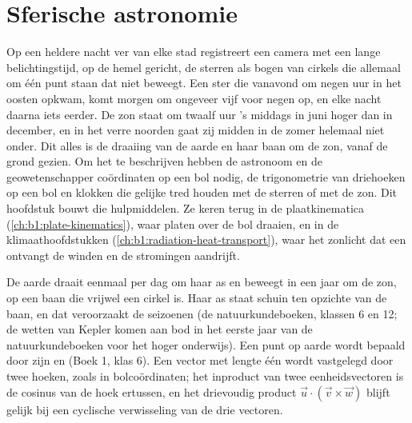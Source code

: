 \chapter{Sferische astronomie}\label{ch:b1:spherical-astronomy}

Op een heldere nacht ver van elke stad registreert een camera met een lange
belichtingstijd, op de hemel gericht, de sterren als bogen van cirkels die
allemaal om één punt staan dat niet beweegt. Een ster die vanavond om negen
uur in het oosten opkwam, komt morgen om ongeveer vijf voor negen op, en elke
nacht daarna iets eerder. De zon staat om twaalf uur 's middags in juni hoger
dan in december, en in het verre noorden gaat zij midden in de zomer helemaal
niet onder. Dit alles is de draaiing van de aarde en haar baan om de zon, vanaf
de grond gezien. Om het te beschrijven hebben de astronoom en de
geowetenschapper coördinaten op een bol nodig, de trigonometrie van driehoeken
op een bol en klokken die gelijke tred houden met de sterren of met de zon.
Dit hoofdstuk bouwt die hulpmiddelen. Ze keren terug in de plaatkinematica
(\cref{ch:b1:plate-kinematics}), waar platen over de bol draaien, en in de
klimaathoofdstukken (\cref{ch:b1:radiation-heat-transport}), waar het zonlicht
dat een  ontvangt de winden en de stromingen aandrijft.

\begin{recall}
De aarde draait eenmaal per dag om haar as en beweegt in een jaar om de zon,
op een baan die vrijwel een cirkel is. Haar as staat schuin ten opzichte van
de baan, en dat veroorzaakt de seizoenen (de natuurkundeboeken, klassen 6 en 12;
de wetten van Kepler komen aan bod in het eerste jaar van de natuurkundeboeken
voor het hoger onderwijs). Een punt op aarde wordt bepaald door zijn
 en  (Boek 1, klas 6). Een vector met lengte één wordt
vastgelegd door twee hoeken, zoals in bolcoördinaten; het inproduct van twee
eenheidsvectoren is de cosinus van de hoek ertussen, en het drievoudig product
$\vec u\cdot(\vec v\times\vec w)$ blijft gelijk bij een cyclische verwisseling
van de drie vectoren.
\end{recall}

